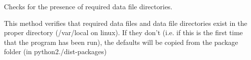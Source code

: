 Checks for the presence of required data file directories. 

This method verifies that required data files and data file directories exist in the proper directory (/var/local on linux). If they don't (i.\-e. if this is the first time that the program has been run), the defaults will be copied from the package folder (in python2./dist-\/packages) 